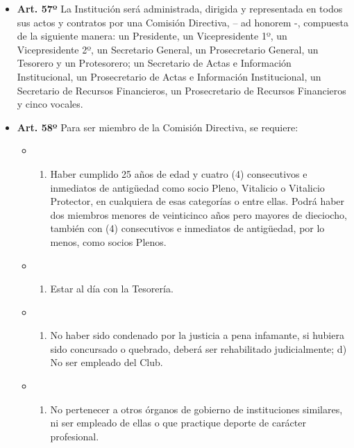 \documentclass[]{book}
\providecommand{\tightlist}{%
  \setlength{\itemsep}{0pt}\setlength{\parskip}{0pt}}
\begin{document}
\begin{itemize}
\tightlist
\item
  \textbf{Art. 57º} La Institución será administrada, dirigida y
  representada en todos sus actos y contratos por una Comisión
  Directiva, -- ad honorem -, compuesta de la siguiente manera: un
  Presidente, un Vicepresidente 1º, un Vicepresidente 2º, un Secretario
  General, un Prosecretario General, un Tesorero y un Protesorero; un
  Secretario de Actas e Información Institucional, un Prosecretario de
  Actas e Información Institucional, un Secretario de Recursos
  Financieros, un Prosecretario de Recursos Financieros y cinco vocales.
\end{itemize}

\begin{itemize}
\tightlist
\item
  \textbf{Art. 58º} Para ser miembro de la Comisión Directiva, se
  requiere:

  \begin{itemize}
  \item
    \begin{enumerate}
    \def\labelenumi{\alph{enumi})}
    \tightlist
    \item
      Haber cumplido 25 años de edad y cuatro (4) consecutivos e
      inmediatos de antigüedad como socio Pleno, Vitalicio o Vitalicio
      Protector, en cualquiera de esas categorías o entre ellas. Podrá
      haber dos miembros menores de veinticinco años pero mayores de
      dieciocho, también con (4) consecutivos e inmediatos de
      antigüedad, por lo menos, como socios Plenos.
    \end{enumerate}
  \item
    \begin{enumerate}
    \def\labelenumi{\alph{enumi})}
    \setcounter{enumi}{1}
    \tightlist
    \item
      Estar al día con la Tesorería.
    \end{enumerate}
  \item
    \begin{enumerate}
    \def\labelenumi{\alph{enumi})}
    \setcounter{enumi}{2}
    \tightlist
    \item
      No haber sido condenado por la justicia a pena infamante, si
      hubiera sido concursado o quebrado, deberá ser rehabilitado
      judicialmente; d) No ser empleado del Club.
    \end{enumerate}
  \item
    \begin{enumerate}
    \def\labelenumi{\alph{enumi})}
    \setcounter{enumi}{3}
    \tightlist
    \item
      No pertenecer a otros órganos de gobierno de instituciones
      similares, ni ser empleado de ellas o que practique deporte de
      carácter profesional.
    \end{enumerate}
  \end{itemize}
\end{itemize}
\end{document}
